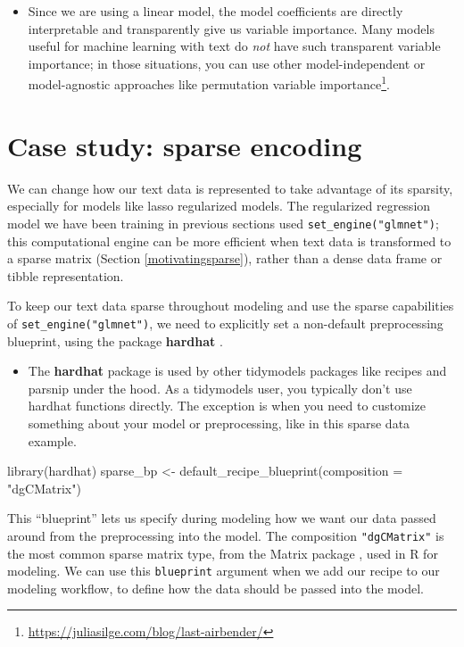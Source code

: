 \documentclass[
]{krantz}
\makeatletter
\newenvironment{Shaded}{\begin{snugshade}}{\end{snugshade}}
\newcommand{\AttributeTok}[1]{\textcolor[rgb]{0.77,0.63,0.00}{#1}}
\newcommand{\FunctionTok}[1]{\textcolor[rgb]{0.00,0.00,0.00}{#1}}
\newcommand{\NormalTok}[1]{#1}
\newcommand{\OtherTok}[1]{\textcolor[rgb]{0.56,0.35,0.01}{#1}}
\newcommand{\StringTok}[1]{\textcolor[rgb]{0.31,0.60,0.02}{#1}}
\DeclareRobustCommand{\href}[2]{#2\footnote{\url{#1}}}
\renewcommand{\href}[2]{#2\footnote{\url{#1}}}
\newenvironment{kframe}{%
\medskip{}
\setlength{\fboxsep}{.8em}
 \def\at@end@of@kframe{}%
 \ifinner\ifhmode%
  \def\at@end@of@kframe{\end{minipage}}%
  \begin{minipage}{\columnwidth}%
 \fi\fi%
 \def\FrameCommand##1{\hskip\@totalleftmargin \hskip-\fboxsep
 \colorbox{shadecolor}{##1}\hskip-\fboxsep
     \hskip-\linewidth \hskip-\@totalleftmargin \hskip\columnwidth}%
 \MakeFramed {\advance\hsize-\width
   \@totalleftmargin\z@ \linewidth\hsize
   \@setminipage}}%
 {\par\unskip\endMakeFramed%
 \at@end@of@kframe}
\renewenvironment{Shaded}{\begin{kframe}}{\end{kframe}}
\newenvironment{rmdblock}[1]
  {\begin{shaded*}
  \begin{itemize}[left = -1cm, labelsep = 1cm]
  \renewcommand{\labelitemi}{
    \raisebox{-.7\height}[0pt][0pt]{
      {\setkeys{Gin}{width=3em,keepaspectratio}\texttt{[image: images/\#1]}}
    }
  }
 
  \item
  }
  {
  \end{itemize}
  \end{shaded*}
  }
\newenvironment{rmdnote}
  {\begin{rmdblock}{note}}
  {\end{rmdblock}}
\newenvironment{rmdpackage}
  {\begin{rmdblock}{package}}
  {\end{rmdblock}}
\makeatother
\begin{document}
\begin{rmdnote}
Since we are using a linear model, the model coefficients are directly
interpretable and transparently give us variable importance. Many models
useful for machine learning with text do \emph{not} have such
transparent variable importance; in those situations, you can use other
model-independent or model-agnostic approaches like
\href{https://juliasilge.com/blog/last-airbender/}{permutation variable
importance}.
\end{rmdnote}

\hypertarget{casestudysparseencoding}{%
\section{Case study: sparse encoding}\label{casestudysparseencoding}}

We can change how our text data is represented to take advantage of its sparsity, especially for models like lasso regularized models. The regularized regression model we have been training in previous sections used \texttt{set\_engine("glmnet")}; this computational engine can be more efficient when text data is transformed to a sparse matrix (Section \ref{motivatingsparse}), rather than a dense data frame or tibble representation.

To keep our text data sparse throughout modeling and use the sparse capabilities of \texttt{set\_engine("glmnet")}, we need to explicitly set a non-default preprocessing blueprint, using the package \textbf{hardhat} \citep{R-hardhat}.

\begin{rmdpackage}
The \textbf{hardhat} package is used by other tidymodels packages like
recipes and parsnip under the hood. As a tidymodels user, you typically
don't use hardhat functions directly. The exception is when you need to
customize something about your model or preprocessing, like in this
sparse data example.
\end{rmdpackage}

\begin{Shaded}
\begin{Highlighting}[]
\FunctionTok{library}\NormalTok{(hardhat)}
\NormalTok{sparse\_bp }\OtherTok{\textless{}{-}} \FunctionTok{default\_recipe\_blueprint}\NormalTok{(}\AttributeTok{composition =} \StringTok{"dgCMatrix"}\NormalTok{)}
\end{Highlighting}
\end{Shaded}

This ``blueprint'' lets us specify during modeling how we want our data passed around from the preprocessing into the model. The composition \texttt{"dgCMatrix"} is the most common sparse matrix type, from the Matrix package \citep{R-Matrix}, used in R for modeling. We can use this \texttt{blueprint} argument when we add our recipe to our modeling workflow, to define how the data should be passed into the model.
\end{document}
